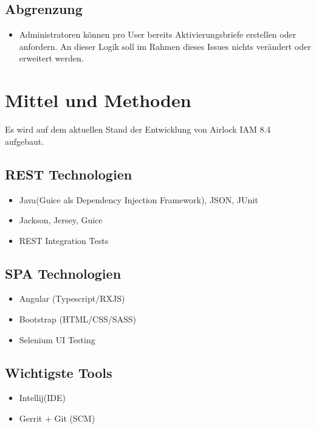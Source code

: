 \subsection*{Abgrenzung}
\begin{itemize}
	\item Administratoren können pro User bereits Aktivierungsbriefe erstellen oder anfordern. An dieser Logik soll im Rahmen dieses Issues nichts verändert oder erweitert werden.
\end{itemize}




\section{Mittel und Methoden}\label{sec:mittel-und-methoden}

Es wird auf dem aktuellen Stand der Entwicklung von Airlock IAM 8.4 aufgebaut.

\subsection*{REST Technologien}
\begin{itemize}
	\item Java(Guice als Dependency Injection Framework), JSON, JUnit
	\item Jackson, Jersey, Guice
	\item REST Integration Tests
\end{itemize}

\subsection*{SPA Technologien}
\begin{itemize}
	\item Angular (Typescript/RXJS)
	\item Bootstrap (HTML/CSS/SASS)
	\item Selenium UI Testing
\end{itemize}

\subsection*{Wichtigste Tools}
\begin{itemize}
	\item Intellij(IDE)
	\item Gerrit + Git (SCM)
\end{itemize}



